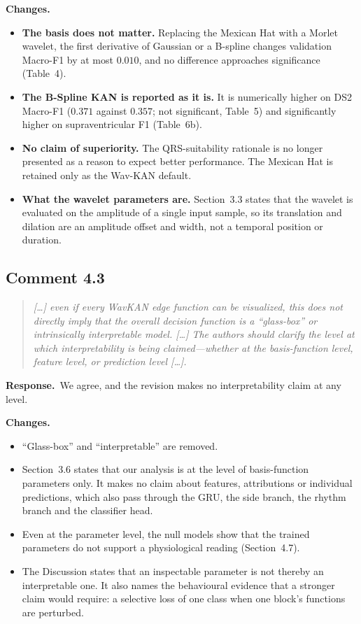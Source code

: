 \documentclass[11pt]{article}
\newenvironment{reviewer}{\begin{quote}\itshape\color{revcol}}{\end{quote}}
\newcommand{\resp}{\textbf{Response.}~}
\newcommand{\chg}{\textbf{Changes.}~}
\begin{document}
\chg
\begin{itemize}[leftmargin=1.2em,itemsep=2pt]
\item \textbf{The basis does not matter.} Replacing the Mexican Hat with a Morlet wavelet, the first derivative of Gaussian or a B-spline changes validation Macro-F1 by at most $0.010$, and no difference approaches significance (Table~4).
\item \textbf{The B-Spline KAN is reported as it is.} It is numerically higher on DS2 Macro-F1 ($0.371$ against $0.357$; not significant, Table~5) and significantly higher on supraventricular F1 (Table~6b).
\item \textbf{No claim of superiority.} The QRS-suitability rationale is no longer presented as a reason to expect better performance. The Mexican Hat is retained only as the Wav-KAN default.
\item \textbf{What the wavelet parameters are.} Section~3.3 states that the wavelet is evaluated on the amplitude of a single input sample, so its translation and dilation are an amplitude offset and width, not a temporal position or duration.
\end{itemize}

\subsection*{Comment 4.3}
\begin{reviewer}
[\ldots] even if every WavKAN edge function can be visualized, this does not directly imply that the overall decision function is a ``glass-box'' or intrinsically interpretable model. [\ldots] The authors should clarify the level at which interpretability is being claimed---whether at the basis-function level, feature level, or prediction level [\ldots].
\end{reviewer}
\resp We agree, and the revision makes no interpretability claim at any level.

\chg
\begin{itemize}[leftmargin=1.2em,itemsep=2pt]
\item ``Glass-box'' and ``interpretable'' are removed.
\item Section~3.6 states that our analysis is at the level of basis-function parameters only. It makes no claim about features, attributions or individual predictions, which also pass through the GRU, the side branch, the rhythm branch and the classifier head.
\item Even at the parameter level, the null models show that the trained parameters do not support a physiological reading (Section~4.7).
\item The Discussion states that an inspectable parameter is not thereby an interpretable one. It also names the behavioural evidence that a stronger claim would require: a selective loss of one class when one block's functions are perturbed.
\end{itemize}
\end{document}

